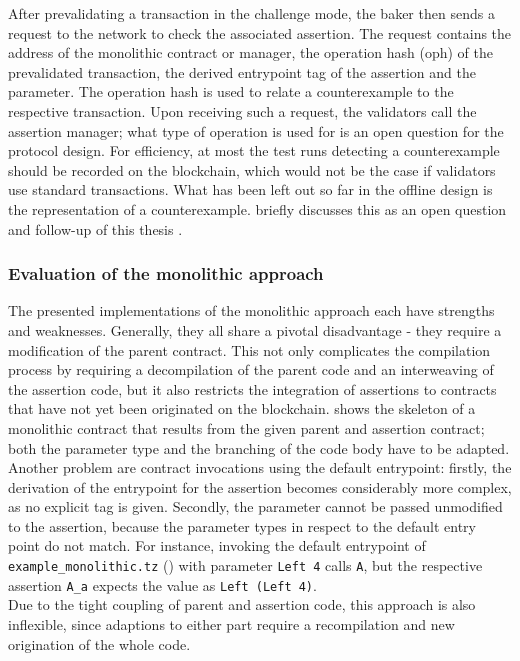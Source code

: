 After prevalidating a transaction in the challenge mode, the baker then sends a request to the network to check the associated assertion. The request contains the address of the monolithic contract or manager, the operation hash (oph) of the prevalidated transaction, the derived entrypoint tag of the assertion and the parameter. The operation hash is used to relate a counterexample to the respective transaction. Upon receiving such a request, the validators call the assertion manager; what type of operation is used for is an open question for the protocol design. For efficiency, at most the test runs detecting a counterexample should be recorded on the blockchain, which would not be the case if validators use standard transactions. What has been left out so far in the offline design is the representation of a counterexample. \secref{} briefly discusses this as an open question and follow-up of this thesis .

\subsubsection{Evaluation of the monolithic approach}
The presented implementations of the monolithic approach each have strengths and weaknesses. Generally, they all share a pivotal disadvantage - they require a modification of the parent contract. This not only complicates the compilation process by requiring a decompilation of the parent code and an interweaving of the assertion code, but it also restricts the integration of assertions to contracts that have not yet been originated on the blockchain.  shows the skeleton of a monolithic contract that results from the given parent and assertion contract; both the parameter type and the branching of the code body have to be adapted. Another problem are contract invocations using the default entrypoint: firstly, the derivation of the entrypoint for the assertion becomes considerably more complex, as no explicit tag is given. Secondly, the parameter cannot be passed unmodified to the assertion, because the parameter types in respect to the default entry point do not match. For instance, invoking the default entrypoint of \texttt{example\_monolithic.tz} () with parameter \texttt{Left 4} calls \texttt{A}, but the respective assertion \texttt{A\_a} expects the value as \texttt{Left (Left 4)}. \\
Due to the tight coupling of parent and assertion code, this approach is also inflexible, since adaptions to either part require a recompilation and new origination of the whole code.



